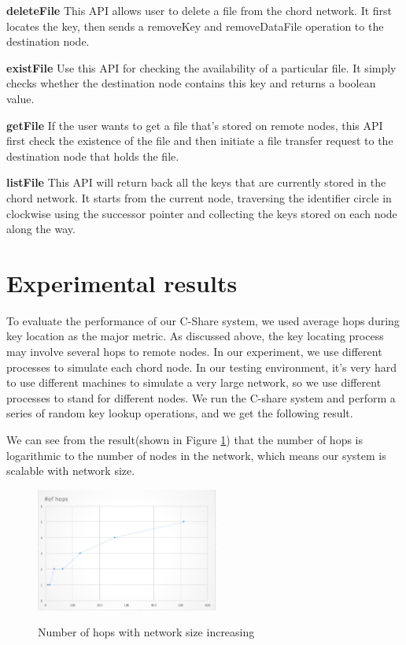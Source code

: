 \documentclass[letterpaper,twocolumn,10pt]{article}
\begin{document}
\noindent\textbf{deleteFile} This API allows user to delete a file from the chord network. It first locates the key, then sends a removeKey and removeDataFile operation to the destination node.

\noindent \textbf{existFile} Use this API for checking the availability of a particular file. It simply checks whether the destination node contains this key and returns a boolean value.

\noindent \textbf{getFile} If the user wants to get a file that's stored on remote nodes, this API first check the existence of the file and then initiate a file transfer request to the destination node that holds the file.

\noindent \textbf{listFile} This API will return back all the keys that are currently stored in the chord network. It starts from the current node, traversing the identifier circle in clockwise using the successor pointer and collecting the keys stored on each node along the way.


\section{Experimental results}
To evaluate the performance of our C-Share system, we used average hops during key location as the major metric.  As discussed above, the key locating process may involve several hops to remote nodes. In our experiment, we use different processes to simulate each chord node. In our testing environment, it's very hard to use different machines to simulate a very large network, so we use different processes to stand for different nodes.  We run the C-share system and perform a series of random key lookup operations, and we get the following result.

We can see from the result(shown in Figure \ref{fig2}) that the number of hops is logarithmic to the number of nodes in the network, which means our system is scalable with network size.

\begin{figure}[!ht]
\centering
\includegraphics[width=60mm]{1.png}\\
\caption{Number of hops with network size increasing}
\label{fig2}
\end{figure}
\end{document}
